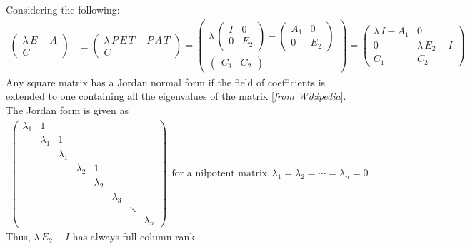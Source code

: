 Considering the following:
\begin{align*}
    \begin{pmatrix}
        \lambda\,E - A \\ C
    \end{pmatrix} &\equiv \begin{pmatrix}
        \lambda\,P\,E\,T - P\,A\,T \\ C
    \end{pmatrix} = \begin{pmatrix}
        \lambda\,\begin{pmatrix}
            I & 0 \\ 0 & E_2 
        \end{pmatrix} - \begin{pmatrix}
            A_1 & 0 \\ 0 & E_2 
        \end{pmatrix} \\ \begin{pmatrix}
            C_1 & C_2
        \end{pmatrix}
    \end{pmatrix}
    = \begin{pmatrix}
        \lambda\,I - A_1 & 0 \\ 0 & \lambda\,E_2 - I \\ C_1 & C_2
    \end{pmatrix}
\end{align*}
Any square matrix has a Jordan normal form if the field of coefficients is extended to one containing all the eigenvalues of the matrix [\emph{from Wikipedia}].
The Jordan form is given as 
\begin{align*}
    \begin{pmatrix}
        \lambda_1 & 1 \\ & \lambda_1 & 1 \\ & & \lambda_1 \\ & & & \lambda_2 & 1 \\ & & & & \lambda_2 \\ & & & & & \lambda_3 \\ & & & & & & \ddots \\ & & & & & & & \lambda_n 
    \end{pmatrix}, \text{for a nilpotent matrix}, \lambda_1 = \lambda_2 = \cdots = \lambda_n = 0
\end{align*}
Thus, $\lambda\,E_2 - I$ has always full-column rank. 


